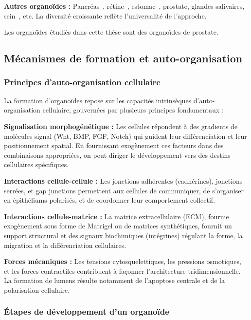 \textbf{Autres organoïdes :}
Pancréas~\cite{Boj2015}, rétine~\cite{Lin2020}, estomac~\cite{Bartfeld2015}, prostate, glandes salivaires, sein~\cite{Sachs2018}, etc. La diversité croissante reflète l'universalité de l'approche.

Les organoïdes étudiés dans cette thèse sont des organoïdes de prostate.

\subsection{Mécanismes de formation et auto-organisation}

\subsubsection{Principes d'auto-organisation cellulaire}

La formation d'organoïdes repose sur les capacités intrinsèques d'auto-organisation cellulaire, gouvernées par plusieurs principes fondamentaux :

\textbf{Signalisation morphogénétique :}
Les cellules répondent à des gradients de molécules signal (Wnt, BMP, FGF, Notch) qui guident leur différenciation et leur positionnement spatial. En fournissant exogènement ces facteurs dans des combinaisons appropriées, on peut diriger le développement vers des destins cellulaires spécifiques.

\textbf{Interactions cellule-cellule :}
Les jonctions adhérentes (cadhérines), jonctions serrées, et gap junctions permettent aux cellules de communiquer, de s'organiser en épithéliums polarisés, et de coordonner leur comportement collectif.

\textbf{Interactions cellule-matrice :}
La matrice extracellulaire (ECM), fournie exogènement sous forme de Matrigel ou de matrices synthétiques, fournit un support structural et des signaux biochimiques (intégrines) régulant la forme, la migration et la différenciation cellulaires.

\textbf{Forces mécaniques :}
Les tensions cytosquelettiques, les pressions osmotiques, et les forces contractiles contribuent à façonner l'architecture tridimensionnelle. La formation de lumens résulte notamment de l'apoptose centrale et de la polarisation cellulaire.

\subsubsection{Étapes de développement d'un organoïde}

